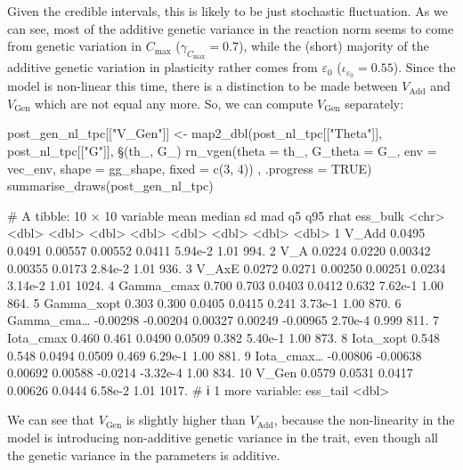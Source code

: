 \documentclass[a4paper,12pt,twoside]{article}
\begin{document}
Given the credible intervals, this is likely to be just stochastic fluctuation.
As we can see, most of the additive genetic variance in the reaction norm seems to come from genetic variation in $C_{\text{max}}$ ($\gamma_{C_{\text{max}}} = 0.7$), while the (short) majority of the additive genetic variation in plasticity rather comes from $\varepsilon_{0}$ ($\iota_{\varepsilon_{0}} = 0.55$).
Since the model is non-linear this time, there is a distinction to be made between $V_{\text{Add}}$ and $V_{\text{Gen}}$ which are not equal any more.
So, we can compute $V_{\text{Gen}}$ separately:
\begin{Rinput}
post_gen_nl_tpc[["V_Gen"]] <-
    map2_dbl(post_nl_tpc[["Theta"]], post_nl_tpc[["G"]],
             \§§(th_, G_) { rn_vgen(theta    = th_,
                                  G_theta  = G_,
                                  env      = vec_env,
                                  shape    = gg_shape,
                                  fixed    = c(3, 4)) },
             .progress = TRUE) 
summarise_draws(post_gen_nl_tpc)
\end{Rinput}
\begin{Routput}
# A tibble: 10 × 10
   variable       mean   median      sd     mad       q5      q95  rhat ess_bulk
   <chr>         <dbl>    <dbl>   <dbl>   <dbl>    <dbl>    <dbl> <dbl>    <dbl>
 1 V_Add       0.0495   0.0491  0.00557 0.00552  0.0411   5.94e-2 1.01      994.
 2 V_A         0.0224   0.0220  0.00342 0.00355  0.0173   2.84e-2 1.01      936.
 3 V_AxE       0.0272   0.0271  0.00250 0.00251  0.0234   3.14e-2 1.01     1024.
 4 Gamma_cmax  0.700    0.703   0.0403  0.0412   0.632    7.62e-1 1.00      864.
 5 Gamma_xopt  0.303    0.300   0.0405  0.0415   0.241    3.73e-1 1.00      870.
 6 Gamma_cma… -0.00298 -0.00204 0.00327 0.00249 -0.00965  2.70e-4 0.999     811.
 7 Iota_cmax   0.460    0.461   0.0490  0.0509   0.382    5.40e-1 1.00      873.
 8 Iota_xopt   0.548    0.548   0.0494  0.0509   0.469    6.29e-1 1.00      881.
 9 Iota_cmax… -0.00806 -0.00638 0.00692 0.00588 -0.0214  -3.32e-4 1.00      834.
10 V_Gen       0.0579   0.0531  0.0417  0.00626  0.0444   6.58e-2 1.01     1017.
# ℹ 1 more variable: ess_tail <dbl>
\end{Routput}
We can see that $V_{\text{Gen}}$ is slightly higher than $V_{\text{Add}}$, because the non-linearity in the model is introducing non-additive genetic variance in the trait, even though all the genetic variance in the parameters is additive.
\end{document}
